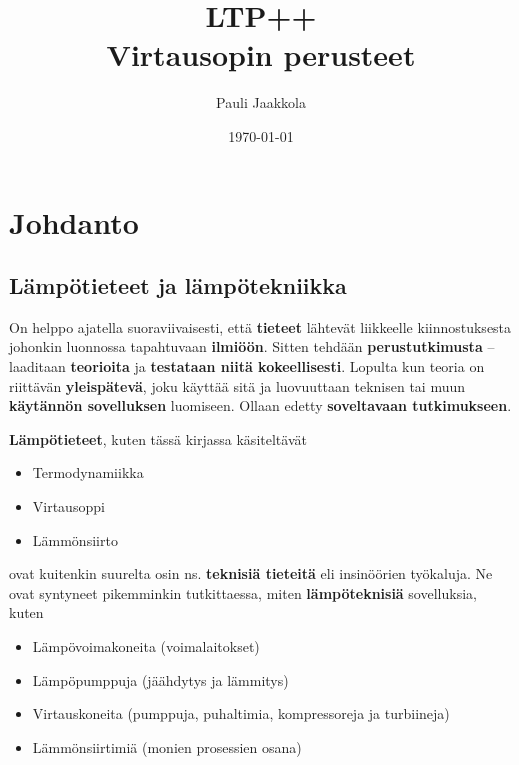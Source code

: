 \documentclass[12pt,a4paper,finnish]{book}
\title{LTP++\\Virtausopin perusteet}
\date{\today}
\author{Pauli Jaakkola}
\begin{document}
\maketitle
\newpage
{}
\setcounter{tocdepth}{3}
\tableofcontents
\newpage
{}
\setcounter{secnumdepth}{3}

\chapter*{Johdanto} %
\renewcommand{\thesection}{\arabic{section}}

\section{Lämpötieteet ja lämpötekniikka} %

On helppo ajatella suoraviivaisesti, että \textbf{tieteet} lähtevät liikkeelle kiinnostuksesta johonkin 
luonnossa tapahtuvaan \textbf{ilmiöön}. 
Sitten tehdään \textbf{perustutkimusta} -- laaditaan \textbf{teorioita} ja \textbf{testataan niitä kokeellisesti}. 
Lopulta kun teoria on riittävän \textbf{yleispätevä}, joku käyttää sitä ja luovuuttaan teknisen tai muun \textbf{käytännön 
sovelluksen} luomiseen. Ollaan edetty \textbf{soveltavaan tutkimukseen}.

\textbf{Lämpötieteet}, kuten tässä kirjassa käsiteltävät

\begin{itemize}
 \item Termodynamiikka
 \item Virtausoppi
 \item Lämmönsiirto
\end{itemize}

ovat kuitenkin suurelta osin ns. \textbf{teknisiä tieteitä} eli insinöörien työkaluja. Ne ovat 
syntyneet pikemminkin tutkittaessa, miten \textbf{lämpöteknisiä} sovelluksia, kuten 

\begin{itemize}
 \item Lämpövoimakoneita (voimalaitokset)
 \item Lämpöpumppuja (jäähdytys ja lämmitys)
 \item Virtauskoneita (pumppuja, puhaltimia, kompressoreja ja turbiineja)
 \item Lämmönsiirtimiä (monien prosessien osana)
\end{itemize}
\end{document}

